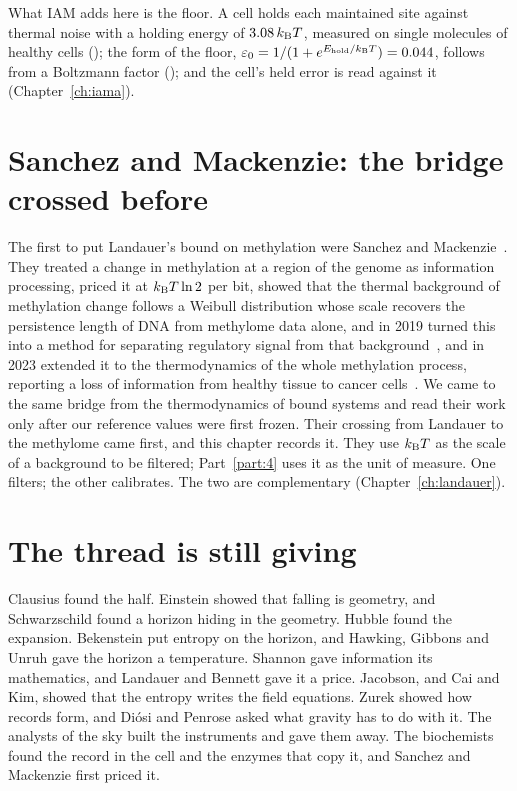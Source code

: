What IAM adds here is the floor. A cell holds each maintained site against thermal noise with a holding energy of $3.08\,k_{\mathrm B} T$, measured on
single molecules of healthy cells (\measured); the form of the floor, $\varepsilon_0=1/(1+e^{E_{\rm hold}/k_{\mathrm B} T})=0.044$, follows from a
Boltzmann factor (\derived); and the cell's held error is read against it (Chapter~\ref{ch:iama}).

\section*{Sanchez and Mackenzie: the bridge crossed before}

The first to put Landauer's bound on methylation were Sanchez and Mackenzie~\cite{Sanchez2016}. They treated a change in methylation at a
region of the genome as information processing, priced it at $k_{\mathrm B} T\ln2$ per bit, showed that the thermal background of methylation change
follows a Weibull distribution whose scale recovers the persistence length of DNA from methylome data alone, and in 2019 turned this into a
method for separating regulatory signal from that background~\cite{Sanchez2019}, and in 2023 extended it to the thermodynamics of the whole methylation process, reporting a loss of
information from healthy tissue to cancer cells~\cite{Sanchez2023}. \observed{} We came to the same bridge from the
thermodynamics of bound systems and read their work only after our reference values were first frozen. Their crossing from Landauer to the
methylome came first, and this chapter records it. They use $k_{\mathrm B} T$ as the scale of a
background to be filtered; Part~\ref{part:4} uses it as the unit of measure. One filters; the other calibrates. The two are complementary
(Chapter~\ref{ch:landauer}).

\section*{The thread is still giving}

Clausius found the half. Einstein showed that falling is geometry, and Schwarzschild found a horizon hiding in the geometry. Hubble found the
expansion. Bekenstein put entropy on the horizon, and Hawking, Gibbons and Unruh gave the horizon a temperature. Shannon gave information its
mathematics, and Landauer and Bennett gave it a price. Jacobson, and Cai and Kim, showed that the entropy writes the field equations. Zurek
showed how records form, and Di\'osi and Penrose asked what gravity has to do with it. The analysts of the sky built the instruments and gave
them away. The biochemists found the record in the cell and the enzymes that copy it, and Sanchez and Mackenzie first priced it.

